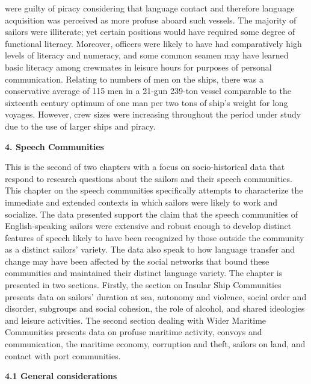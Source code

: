 \begin{styleStandard}
were guilty of piracy considering that language contact and therefore language acquisition was perceived as more profuse aboard such vessels. The majority of sailors were illiterate; yet certain positions would have required some degree of functional literacy. Moreover, officers were likely to have had comparatively high levels of literacy and numeracy, and some common seamen may have learned basic literacy among crewmates in leisure hours for purposes of personal communication. Relating to numbers of men on the ships, there was a conservative average of 115 men in a 21-gun 239-ton vessel comparable to the sixteenth century optimum of one man per two tons of ship’s weight for long voyages. However, crew sizes were increasing throughout the period under study due to the use of larger ships and piracy. 
\end{styleStandard}

\clearpage\begin{styleStandard}
\textbf{4. Speech Communities}
\end{styleStandard}

\begin{styleStandard}
This is the second of two chapters with a focus on socio-historical data that respond to research questions about the sailors and their speech communities. This chapter on the speech communities specifically attempts to characterize the immediate and extended contexts in which sailors were likely to work and socialize. The data presented support the claim that the speech communities of English-speaking sailors were extensive and robust enough to develop distinct features of speech likely to have been recognized by those outside the community as a distinct sailors’ variety. The data also speak to how language transfer and change may have been affected by the social networks that bound these communities and maintained their distinct language variety. The chapter is presented in two sections. Firstly, the section on Insular Ship Communities presents data on sailors’ duration at sea, autonomy and violence, social order and disorder, subgroups and social cohesion, the role of alcohol, and shared ideologies and leisure activities. The second section dealing with Wider Maritime Communities presents data on profuse maritime activity, convoys and communication, the maritime economy, corruption and theft, sailors on land, and contact with port communities. 
\end{styleStandard}

\begin{styleStandard}
\textbf{4.1 General considerations}
\end{styleStandard}

